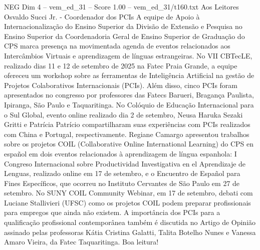 \begin{textsample}{NEG Dim 4 – vem\_ed\_31 – Score 1.00 – vem\_ed\_31/t160.txt}  \label{ex:f4_neg_023}
Aos Leitores Osvaldo Succi Jr. - Coordenador dos PCIs A equipe de Apoio à Internacionalização do Ensino Superior da Divisão de Extensão e Pesquisa no Ensino Superior da Coordenadoria Geral de Ensino Superior de Graduação do CPS marca presença na movimentada agenda de eventos relacionados aos Intercâmbios Virtuais e aprendizagem de línguas estrangeiras.
No VII CBTecLE, realizado dias 11 e 12 de setembro de 2025 na Fatec Praia Grande, a equipe ofereceu um workshop sobre as ferramentas de Inteligência Artificial na gestão de Projetos Colaborativos Internacionais (PCIs).
Além disso, cinco PCIs foram apresentados no congresso por professores das Fatecs Barueri, Bragança Paulista, Ipiranga, São Paulo e Taquaritinga.
No Colóquio de Educação Internacional para o Sul Global, evento online realizado dia 2 de setembro, Neusa Haruka Sezaki Gritti e Patrícia Patrício compartilharam suas experiências com PCIs realizados com China e Portugal, respectivamente.
Regiane Camargo apresentou trabalhos sobre os projetos COIL (Collaborative Online International Learning) do CPS en español em dois eventos relacionados à aprendizagem de língua espanhola: I Congreso Internacional sobre Productividad Investigativa en el Aprendizaje de Lenguas, realizado online em 17 de setembro, e o Encuentro de Español para Fines Específicos, que ocorreu no Instituto Cervantes de São Paulo em 27 de setembro.
No SUNY COIL Community Webinar, em 17 de setembro, debati com Luciane Stallivieri (UFSC) como os projetos COIL podem preparar profissionais para empregos que ainda não existem.
A importância dos PCIs para a qualificação profissional contemporânea também é discutida no Artigo de Opinião assinado pelas professoras Kátia Cristina Galatti, Talita Botelho Nunes e Vanessa Amaro Vieira, da Fatec Taquaritinga.
Boa leitura!

\end{textsample}
